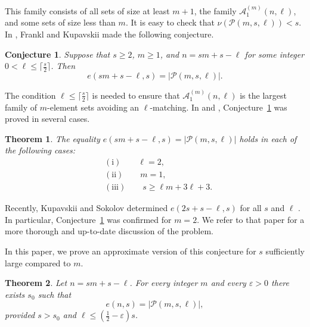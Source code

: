 \documentclass{article}
\newtheorem{conj}{Conjecture}
\newtheorem{theorem}{Theorem}
\begin{document}
This family consists of all sets of size at least $m+1$, the family $\mathcal{A}_1^{(m)}(n, \ell)$, and some sets of size less than $m$. It is easy to check that $\nu(\mathcal{P}(m,s,\ell)) < s$. In \cite{FK9}, Frankl and Kupavskii made the following conjecture.

\begin{conj} \label{conj: EK}
    Suppose that $s\ge 2$, $m\ge 1$, and $n = sm+s-\ell$ for some integer $0<\ell\le \lceil \frac s2\rceil$. Then
    \begin{equation}\label{eq007}
        e(sm+s-\ell,s) = |\mathcal{P}(m,s,\ell)|.
    \end{equation}
\end{conj}

The condition $\ell\le \lceil \frac s2\rceil$ is needed to ensure that $\mathcal{A}_1^{(m)}(n, \ell)$ is the largest family of $m$-element sets avoiding an $\ell$-matching.
In \cite{FK9} and \cite{FK8}, Conjecture~\ref{conj: EK} was proved in several cases.

\begin{theorem} \label{t: Frankl-Kupavskii EK}
The equality $e(sm+s-\ell,s) = |\mathcal{P}(m,s,\ell)|$ holds in each of the following cases:
\begin{align*}
    &\mathrm{(i)}\qquad \ell = 2, \\
    &\mathrm{(ii)}\qquad m=1,\\
    &\mathrm{(iii)}\qquad s\ge \ell m+3\ell+3.
\end{align*}
\end{theorem}

Recently, Kupavskii and Sokolov determined $e(2s + s - \ell, s)$ for all $s$ and $\ell$ \cite{KS}. In particular, Conjecture~\ref{conj: EK} was confirmed for $m=2$. We refer to that paper for a more thorough and up-to-date discussion of the problem.

In this paper, we prove an approximate version of this conjecture for $s$ sufficiently large compared to $m$.

\begin{theorem} \label{t: main}
    Let $n = sm + s - \ell$. For every integer $m$ and every $\varepsilon > 0$ there exists $s_0$ such that
    \begin{equation}\label{eq: main theorem}
        e(n,s) = |\mathcal{P}(m,s,\ell)|,
    \end{equation}
    provided $s > s_0$ and $\ell \leq \left(\frac{1}{2} - \varepsilon\right)s$.
\end{theorem}
\end{document}
